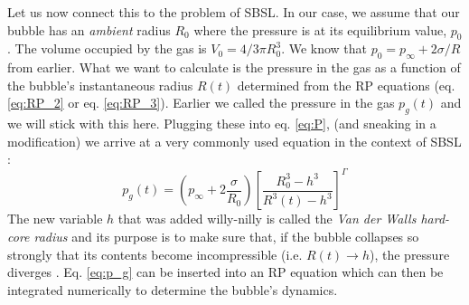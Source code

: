 \documentclass[rmp,aps,nofootinbib,superscriptaddress,floatfix]{revtex4-2}
\begin{document}
Let us now connect this to the problem of SBSL. In our case, we assume that our bubble has an \emph{ambient} radius $R_0$ where the pressure is at its equilibrium value, $p_0$. The volume occupied by the gas is $V_0 =  4/3 \pi R_0^3$. We know that $p_0=p_\infty+2\sigma /R$ from earlier. What we want to calculate is the pressure in the gas as a function of the bubble's instantaneous radius $R(t)$ determined from the RP equations (eq. \ref{eq:RP_2} or eq. \ref{eq:RP_3}). Earlier we called the pressure in the gas $p_g(t)$ and we will stick with this here. Plugging these into eq. \ref{eq:P}, (and sneaking in a modification) we arrive at a very commonly used equation in the context of SBSL \cite{brenner2002single,lofstedt1995sonoluminescing,barber1997defining,lofstedt1993toward,hilgenfeldt1999simple}:
\begin{equation}
    p_g(t) = \left( p_\infty+2\frac{\sigma}{R_0} \right) \left[ \frac{R_0^3-h^3}{R^3(t)-h^3} \right] ^ \Gamma
    \label{eq:p_g}
\end{equation}
The new variable $h$ that was added willy-nilly is called the \emph{Van der Walls hard-core radius} and its purpose is to make sure that, if the bubble collapses so strongly that its contents become incompressible (i.e. $R(t)\rightarrow h$), the pressure diverges \cite{lofstedt1993toward,brenner2002single}. Eq. \ref{eq:p_g} can be inserted into an RP equation which can then be integrated numerically to determine the bubble's dynamics. 
\end{document}
